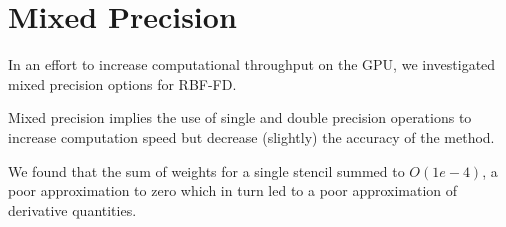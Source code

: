 \chapter{Mixed Precision}

In an effort to increase computational throughput on the GPU, we investigated mixed precision options for RBF-FD. 

Mixed precision implies the use of single and double precision operations to increase computation speed but decrease (slightly) the accuracy of the method. 


We found that the sum of weights for a single stencil summed to $O(1e-4)$, a poor approximation to zero which in turn led to a poor approximation of derivative quantities.  

